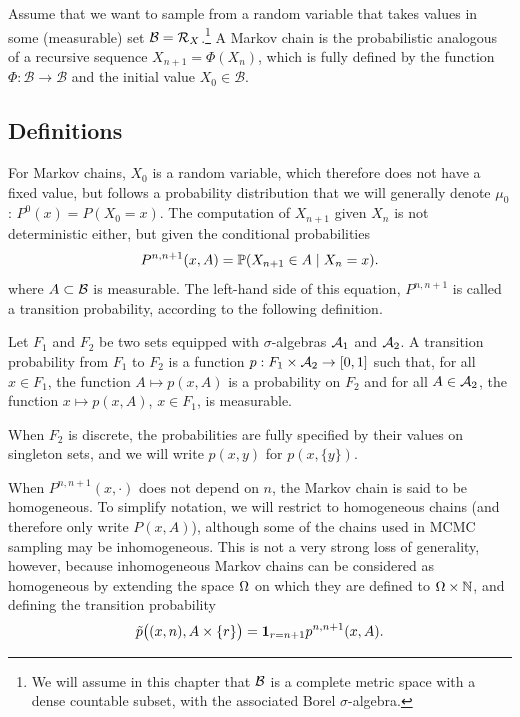 
Assume that we want to sample from a random variable that takes values in some (measurable) set ${\mathcal B} = {\mathcal R}_X$.\footnote{We will assume in this chapter that ${\mathcal B}$ is a complete metric space with a dense countable subset, with the associated Borel $\sigma$-algebra.}
A Markov chain is the probabilistic analogous of a recursive sequence
$X_{n+1} = \Phi(X_n)$, which is fully defined by the function $\Phi:\mathcal B\to \mathcal B$ and the
initial value $X_0\in \mathcal B$. 

\subsection{Definitions}

For Markov chains, $X_0$ is a random variable,
which therefore does not have a fixed value, but follows a probability
distribution that we will generally denote $\mu_0$: $P^0(x) = P(X_0=x)$. The computation of
$X_{n+1}$ given $X_n$ is not deterministic either, but given the conditional probabilities
\[
P^{n,n+1}(x, A) = \bm{\mathbb P}(X_{n+1} \in A \mid X_n =  x).
\]
where $A\subset {\mathcal B}$ is measurable. The left-hand side of this equation, $P^{n,n+1}$ is called a transition probability, according to the following definition.
\begin{definition}
\label{def:trans.prob}
Let $F_1$ and $F_2$ be two sets equipped with $\sigma$-algebras ${\mathcal A}_1$ and ${\mathcal A}_2$. A transition probability from
$F_1$ to $F_2$ is a function $p:F_1\times {\mathcal A}_2 \to [0,1]$  such that, for
all $x\in F_1$, the function $A \mapsto p(x, A)$ is a probability on $F_2$ and for all $A\in {\mathcal A}_2$, the function $x\mapsto p(x, A)$, $x\in F_1$, is measurable.

When $F_2$ is discrete, the probabilities are fully specified by their values on singleton sets, and we will write $p(x,y)$ for $p(x, \{y\})$.
\end{definition}

 When $P^{n,
n+1}(x, \cdot)$ does not depend on $n$, the Markov chain is said to
be homogeneous. To simplify notation, we will restrict to homogeneous
chains (and therefore only write $P(x, A)$), although some of the chains used in MCMC sampling may be
inhomogeneous. This is not a very strong loss of generality, however,
because inhomogeneous Markov chains can be considered as homogeneous
by extending the space $\Omega$ on which they are defined to $\Omega\times
{\mathbb{N}}$, and defining the transition probability
\[
\tilde p\big((x,n), A\times \{r\}\big) = {\bm 1}_{r=n+1} p^{n,n+1}(x, A).
\]


